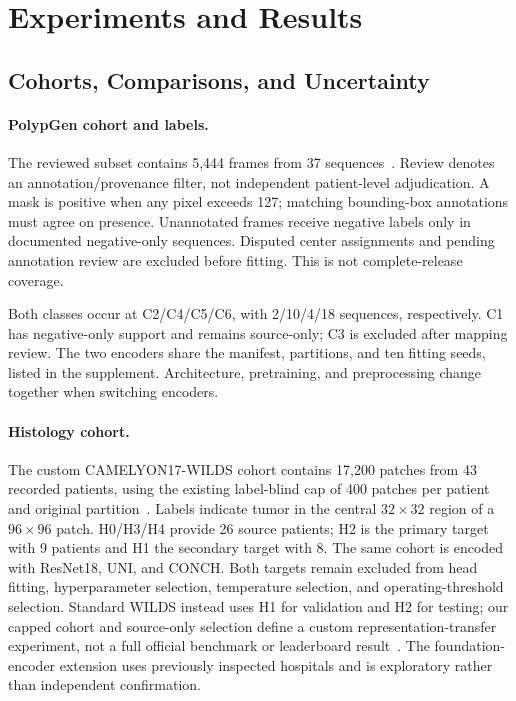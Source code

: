 \section{Experiments and Results}
\label{sec:results}

\subsection{Cohorts, Comparisons, and Uncertainty}
\label{sec:experimental_design}

\paragraph{PolypGen cohort and labels.}
The reviewed subset contains 5,444 frames from 37 sequences~\cite{ali2023polypgen}. Review denotes an annotation/provenance filter, not independent patient-level adjudication. A mask is positive when any pixel exceeds 127; matching bounding-box annotations must agree on presence. Unannotated frames receive negative labels only in documented negative-only sequences. Disputed center assignments and pending annotation review are excluded before fitting. This is not complete-release coverage.

Both classes occur at C2/C4/C5/C6, with 2/10/4/18 sequences, respectively. C1 has negative-only support and remains source-only; C3 is excluded after mapping review. The two encoders share the manifest, partitions, and ten fitting seeds, listed in the supplement. Architecture, pretraining, and preprocessing change together when switching encoders.

\paragraph{Histology cohort.}
The custom CAMELYON17-WILDS cohort contains 17,200 patches from 43 recorded patients, using the existing label-blind cap of 400 patches per patient and original partition~\cite{bandi2019camelyon,koh2021wilds}. Labels indicate tumor in the central $32\times32$ region of a $96\times96$ patch. H0/H3/H4 provide 26 source patients; H2 is the primary target with 9 patients and H1 the secondary target with 8. The same cohort is encoded with ResNet18, UNI, and CONCH. Both targets remain excluded from head fitting, hyperparameter selection, temperature selection, and operating-threshold selection. Standard WILDS instead uses H1 for validation and H2 for testing; our capped cohort and source-only selection define a custom representation-transfer experiment, not a full official benchmark or leaderboard result~\cite{wilds2026submission}. The foundation-encoder extension uses previously inspected hospitals and is exploratory rather than independent confirmation.


